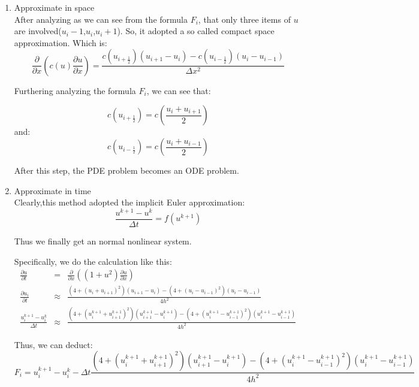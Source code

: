 \documentclass[11pt]{article}
\begin{document}
    \begin{enumerate}
    \item Approximate in space\\
    After analyzing as we can see from the formula $F_i$, that only three items of $u$ are involved($u_i-1$,$u_i$,$u_i+1$). So, it adopted a so called compact space approximation. Which is:
    $$\frac{\partial}{\partial x}\left( c(u)\frac{\partial u}{\partial x}\right ) = \frac{c(u_{i+\frac{1}{2}})(u_{i+1}-u_i)-c(u_{i-\frac{1}{2}})(u_i-u_{i-1})}{\Delta x^2}$$
    
    Furthering analyzing the formula $F_i$, we can see that:
    
    $$c(u_{i+\frac{1}{2}})=c\left(\frac{u_i+u_{i+1}}{2}\right)$$
    and:
    $$c(u_{i-\frac{1}{2}})=c\left(\frac{u_i+u_{i-1}}{2}\right)$$
    
    After this step, the PDE problem becomes an ODE problem.
    \item Approximate in time\\
    Clearly,this method adopted the implicit Euler approximation:
    $$\frac{u^{k+1}-u^{k}}{\Delta t}=f(u^{k+1})$$
    
    Thus we finally get an normal nonlinear system.
    
    Specifically, we do the calculation like this:
    \begin{eqnarray*}
    \frac{\partial u}{\partial t} &=& \frac{\partial}{\partial x} \left( \left(1+u^2 \right)\frac{\partial u}{\partial x} \right)\\
    \frac{\partial u_i}{\partial t} &\approx& \frac{\left(4+\left(u_i+u_{i+1}\right)^2\right)\left(u_{i+1}-u_i\right) - \left(4+\left(u_i-u_{i-1}\right)^2\right)\left(u_i-u_{i-1}\right)}{4 h^2}\\
    \frac{u_i^{k+1}-u_i^{k}}{\Delta t} &\approx& \frac{\left(4+\left(u_i^{k+1}+u_{i+1}^{k+1}\right)^2\right)\left(u_{i+1}^{k+1}-u^{k+1}_i\right) - \left(4+\left(u_i^{k+1}-u_{i-1}^{k+1}\right)^2\right)\left(u_i^{k+1}-u_{i-1}^{k+1}\right)}{4 h^2}
    \end{eqnarray*}
    
    Thus, we can deduct:
    \begin{dmath*}
    F_i = u_i^{k+1}-u_i^{k} - \Delta t \frac{\left(4+\left(u_i^{k+1}+u_{i+1}^{k+1}\right)^2\right)\left(u_{i+1}^{k+1}-u^{k+1}_i\right) - \left(4+\left(u_i^{k+1}-u_{i-1}^{k+1}\right)^2\right)\left(u_i^{k+1}-u_{i-1}^{k+1}\right)}{4 h^2}    \end{dmath*}   
    \end{enumerate}
\end{document}
